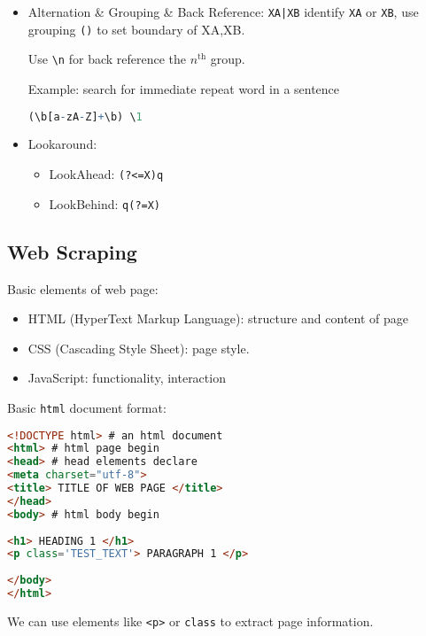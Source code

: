 \begin{itemize}[topsep=2pt,itemsep=0pt]
        
    \item Alternation \& Grouping \& Back Reference: \lstinline!XA|XB! identify \lstinline|XA| or \lstinline|XB|, use grouping \lstinline|()| to set boundary of XA,XB.
    
    Use \lstinline|\n| for back reference the $ n^\mathrm{th}  $ group. 
\begin{rcode}
    Example: search for immediate repeat word in a sentence
\begin{lstlisting}[language=R]
(\b[a-zA-Z]+\b) \1
\end{lstlisting}
\end{rcode}
    \item Lookaround: 
    \begin{itemize}[topsep=2pt,itemsep=0pt]
        \item LookAhead: \lstinline|(?<=X)q|
        \item LookBehind: \lstinline|q(?=X)|
    \end{itemize}
    
        
\end{itemize}

    
\subsection{Web Scraping}
    Basic elements of web page:
\begin{itemize}[topsep=2pt,itemsep=0pt]
    \item HTML (HyperText Markup Language): structure and content of page
    \item CSS (Cascading Style Sheet): page style.
    \item JavaScript: functionality, interaction
\end{itemize}

        
Basic \lstinline|html| document format:

\begin{rcode}
\begin{lstlisting}[language=HTML]
<!DOCTYPE html> # an html document
<html> # html page begin
<head> # head elements declare
<meta charset="utf-8">
<title> TITLE OF WEB PAGE </title>
</head>
<body> # html body begin
 
<h1> HEADING 1 </h1>
<p class='TEST_TEXT'> PARAGRAPH 1 </p>
 
</body>
</html>
\end{lstlisting}
\end{rcode}

    We can use elements like \lstinline|<p>| or \lstinline|class| to extract page information.


